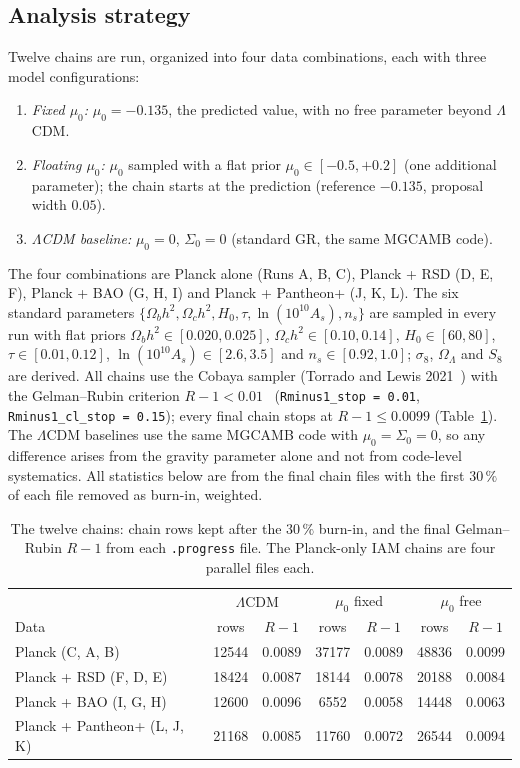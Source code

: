 \subsection{Analysis strategy}
Twelve chains are run, organized into four data combinations, each with three model configurations:
\begin{enumerate}
\item \emph{Fixed $\mu_0$:} $\mu_0=-0.135$, the predicted value, with no free parameter beyond $\Lambda$CDM.
\item \emph{Floating $\mu_0$:} $\mu_0$ sampled with a flat prior $\mu_0\in[-0.5,+0.2]$ (one additional parameter); the chain starts at the prediction
(reference $-0.135$, proposal width $0.05$).
\item \emph{$\Lambda$CDM baseline:} $\mu_0=0$, $\Sigma_0=0$ (standard GR, the same MGCAMB code).
\end{enumerate}
The four combinations are Planck alone (Runs A, B, C), Planck + RSD (D, E, F), Planck + BAO (G, H, I) and Planck + Pantheon+ (J, K, L). The six
standard parameters $\{\Omega_bh^2,\Omega_ch^2,H_0,\tau,\ln(10^{10}A_s),n_s\}$ are sampled in every run with flat priors $\Omega_bh^2\in[0.020,0.025]$,
$\Omega_ch^2\in[0.10,0.14]$, $H_0\in[60,80]$, $\tau\in[0.01,0.12]$, $\ln(10^{10}A_s)\in[2.6,3.5]$ and $n_s\in[0.92,1.0]$; $\sigma_8$, $\Omega_\Lambda$
and $S_8$ are derived. All chains use the Cobaya sampler (Torrado and Lewis 2021~\cite{Torrado2021}) with the Gelman--Rubin criterion
$R-1<0.01$~\cite{Gelman1992} (\texttt{Rminus1\_stop = 0.01}, \texttt{Rminus1\_cl\_stop = 0.15}); every final chain stops at $R-1\le0.0099$
(Table~\ref{tab:lt_chains}). The $\Lambda$CDM baselines use the same MGCAMB code with $\mu_0=\Sigma_0=0$, so any difference arises from the gravity
parameter alone and not from code-level systematics. All statistics below are from the final chain files with the first $30\,\%$ of each file
removed as burn-in, weighted.

\begin{table}[htbp]\centering\small
\caption{The twelve chains: chain rows kept after the $30\,\%$ burn-in, and the final Gelman--Rubin $R-1$ from each \texttt{.progress} file. The
Planck-only IAM chains are four parallel files each. \measured}\label{tab:lt_chains}
\begin{tabular}{lcccccc}\hline
& \multicolumn{2}{c}{$\Lambda$CDM} & \multicolumn{2}{c}{$\mu_0$ fixed} & \multicolumn{2}{c}{$\mu_0$ free}\\
Data & rows & $R-1$ & rows & $R-1$ & rows & $R-1$\\\hline
Planck (C, A, B) & 12544 & 0.0089 & 37177 & 0.0089 & 48836 & 0.0099\\
Planck + RSD (F, D, E) & 18424 & 0.0087 & 18144 & 0.0078 & 20188 & 0.0084\\
Planck + BAO (I, G, H) & 12600 & 0.0096 & 6552 & 0.0058 & 14448 & 0.0063\\
Planck + Pantheon+ (L, J, K) & 21168 & 0.0085 & 11760 & 0.0072 & 26544 & 0.0094\\\hline
\end{tabular}\end{table}

